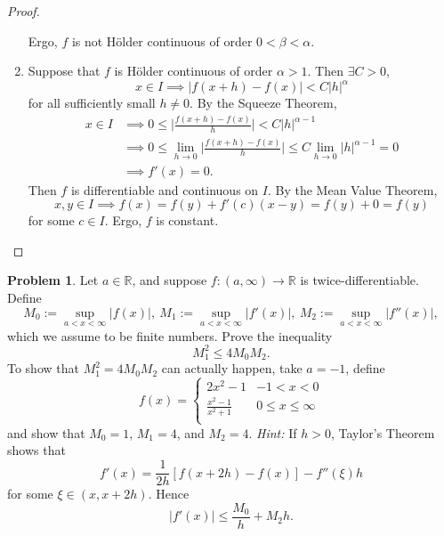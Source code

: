 \documentclass{amsart}
\theoremstyle{definition}
\newtheorem{problem}{Problem}
\begin{document}
\begin{proof}
\begin{enumerate}[label = (\alph*)]
\[        \]
        Ergo, $f$ is not H\"{o}lder continuous of order $0 < \beta < \alpha$.
        \item Suppose that $f$ is H\"{o}lder continuous of order $\alpha > 1$. Then $\exists C > 0$, 
        \[
        x \in I \implies \vert f(x+h) - f(x) \vert < C \vert h \vert^{\alpha}
        \]
        for all sufficiently small $h \neq 0$. By the Squeeze Theorem, 
        \begin{align*}
            x \in I &\implies 0 \leq \bigg \vert \frac{f(x+h) - f(x)}{h} \bigg \vert < C\vert h \vert^{\alpha - 1} \\
            &\implies 0 \leq \lim_{h \to 0}\bigg \vert \frac{f(x+h) - f(x)}{h} \bigg \vert \leq C\lim_{h \to 0}\vert h \vert^{\alpha-1} = 0 \\
            &\implies f'(x) = 0.
        \end{align*}
        Then $f$ is differentiable and continuous on $I$. By the Mean Value Theorem, 
        \[
        x,y \in I \implies f(x) = f(y) + f'(c)(x - y) = f(y) + 0 = f(y)
        \]
        for some $c \in I$. Ergo, $f$ is constant. 
    \end{enumerate}
\end{proof}

\begin{problem}
    Let $a \in \mathbb{R}$, and suppose $f : (a, \infty) \to \mathbb{R}$ is twice-diﬀerentiable. Define
    \[
    M_0 := \sup_{a < x < \infty}\vert f(x) \vert, \ M_1 := \sup_{a < x < \infty}\vert f'(x) \vert, \ M_2 := \sup_{a < x < \infty}\vert f''(x) \vert,
    \]
    which we assume to be finite numbers. Prove the inequality
    \[
    M_1^2 \leq 4M_0M_2.
    \]
    To show that $M_1^2 = 4M_0M_2$ can actually happen, take $a = -1$, define
    \[
    f(x) = \begin{cases}
        2x^2-1 & -1 < x < 0 \\
        \frac{x^2-1}{x^2+1} & 0 \leq x \leq \infty \\
    \end{cases}
    \]
    and show that $M_0 = 1$, $M_1 = 4$, and $M_2 = 4$.
    \textit{Hint:} If $h > 0$, Taylor’s Theorem shows that 
    \[
    f'(x) = \frac{1}{2h}[f(x+2h) - f(x)] - f''(\xi)h
    \]
    for some $\xi \in (x,x+2h)$. Hence
    \[
    |f'(x)| \leq \frac{M_0}{h} + M_2h.
    \]
\end{problem}
\end{document}
